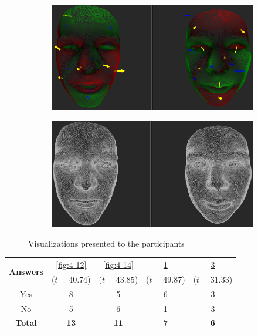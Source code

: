 \begin{figure}[h]
\begin{subfigure}{0.4\textwidth}
\includegraphics[width=\textwidth]{./screenshots/pair11.PNG}
\caption{}
\label{fig:4-11}
\end{subfigure}
\quad
\begin{subfigure}{0.4\textwidth}
\includegraphics[width=\textwidth]{./screenshots/pair13.PNG}
\caption{}
\label{fig:4-13}
\end{subfigure}
\caption{Visualizations presented to the participants}
\end{figure}
\medskip
\begin{center}
\begin{tabular}{| c | c | c | c | c |}
	\hline
\multirow{2}{*}{\bf Answers} & \ref{fig:4-12} & \ref{fig:4-14} & \ref{fig:4-11} & \ref{fig:4-13}\\
	&  (\(t=40.74\)) &  (\(t=43.85\)) &  (\(t=49.87\)) &  (\(t=31.33\))\\ \hline
	Yes & 8 & 5 & 6 & 3\\ \hline
	No & 5 & 6 & 1 & 3\\ \hline
	{\bf Total} & {\bf 13} & {\bf 11} & {\bf 7} & {\bf 6}\\ \hline
\end{tabular}
\end{center}
\clearpage

